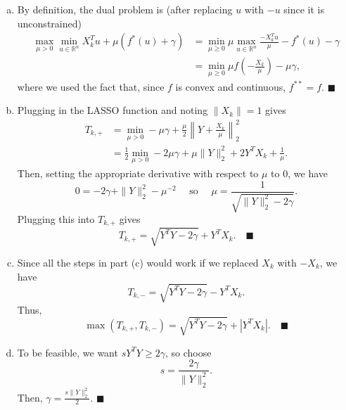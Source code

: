 \documentclass[12pt]{article}
\newcommand{\R}{\mathbb{R}}
\renewcommand{\qed}{\quad \ensuremath{\blacksquare}}
\begin{document}
\begin{enumerate}[(a)]
\item By definition, the dual problem is (after replacing $u$ with $-u$ since
it is unconstrained)
\begin{align*}
\max_{\mu > 0} \min_{u \in \R^n} X_k^Tu + \mu(f^*(u) + \gamma)
    & = \min_{\mu \geq 0} \mu \max_{u \in \R^n}
                                \frac{-X_k^Tu}{\mu} - f^*(u) - \gamma   \\
    & = \min_{\mu \geq 0}
        \mu f\left( -\frac{X_k}{\mu} \right) - \mu\gamma,
\end{align*}
where we used the fact that, since $f$ is convex and continuous, $f^{**} = f$.
\qed

\item Plugging in the LASSO function and noting $\|X_k\| = 1$ gives
\begin{align*}
T_{k,+}
 &  = \min_{\mu > 0} - \mu\gamma
    + \frac{\mu}{2}\left\| Y + \frac{X_k}{\mu}\right\|_2^2  \\
 &  = \frac{1}{2} \min_{\mu > 0} - 2\mu\gamma
    + \mu \|Y\|_2^2 + 2Y^TX_k + \frac{1}{\mu}.
\end{align*}
Then, setting the appropriate derivative with respect to $\mu$ to $0$, we have
\[0 = -2\gamma + \|Y\|_2^2 - \mu^{-2}
    \quad \mbox{ so } \quad
  \mu = \frac{1}{\sqrt{\|Y\|_2^2 - 2\gamma}}.
\]
Plugging this into $T_{k,+}$ gives
\[T_{k,+} = \sqrt{Y^TY - 2\gamma} + Y^TX_k. \qed\]

\item Since all the steps in part (c) would work if we replaced $X_k$ with
$-X_k$, we have
\[T_{k,-} = \sqrt{Y^TY - 2\gamma} - Y^TX_k.\]
Thus,
\[\max(T_{k,+},T_{k,-}) = \sqrt{Y^TY - 2\gamma} + |Y^TX_k|. \qed\]

\item To be feasible, we want $sY^TY \geq 2\gamma$, so choose
\[s = \frac{2\gamma}{\|Y\|_2^2}.\]
Then, $\gamma = \frac{s\|Y\|_2^2}{2}$. \qed

\end{enumerate}
\end{document}
